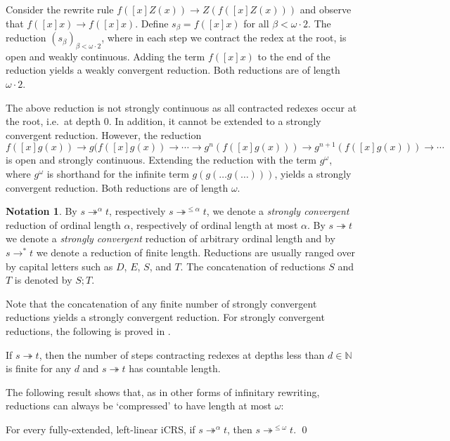 \documentclass{LMCS}
\theoremstyle{definition}
\newtheorem{notation}[thm]{Notation}
\newcommand{\rew}{\rightarrow}
\newcommand{\rewt}{\rightarrow^*}
\newcommand{\trewt}{\twoheadrightarrow}
\newcommand{\trewtp}[1]{\twoheadrightarrow^{#1}}
\newcommand{\natnum}{\mathbb{N}}
\begin{document}
\begin{exa}
\label{ex:wconv}
Consider the rewrite rule $f([x]Z(x)) \rew Z(f([x]Z(x)))$ and observe that $f([x]x) \rew f([x]x)$. Define $s_\beta = f([x]x)$ for all $\beta < \omega \cdot 2$. The reduction $(s_\beta)_{\beta < \omega \cdot 2}$, where in each step we contract the redex at the root, is open and weakly continuous. Adding the term $f([x]x)$ to the end of the reduction yields a weakly convergent reduction. Both reductions are of length $\omega \cdot 2$.

The above reduction is not strongly continuous as all contracted redexes occur at the root, i.e.\ at depth $0$. 
In addition, it cannot be extended to a strongly convergent reduction.
However, the reduction
\[
f([x]g(x)) \rew g(f([x]g(x)) \rew \cdots \rew g^n(f([x]g(x))) \rew g^{n + 1}(f([x]g(x))) \rew \cdots
\]
is open and strongly continuous. Extending the reduction with the term $g^\omega$, where $g^\omega$ is shorthand for the infinite term $g(g(\ldots g(\ldots)))$, yields a strongly convergent reduction. Both reductions are of length $\omega$.
\end{exa}

\begin{notation}
By $s \trewtp{\alpha} t$, respectively $s \trewtp{\leq \alpha} t$, we
denote a \emph{strongly convergent} reduction of ordinal
length $\alpha$, respectively of ordinal length at most
$\alpha$. By $s \trewt t$ we denote a \emph{strongly convergent}
reduction of arbitrary ordinal length and by $s \rewt t$
we denote a reduction of finite length.
Reductions are usually ranged over by
capital letters such as $D$, $E$, $S$, and $T$.
The concatenation of reductions $S$ and $T$ 
is denoted by $S ; T$.
\end{notation}

Note that the concatenation of any finite number of strongly convergent reductions yields a strongly convergent reduction. For strongly convergent reductions, the following is proved in \cite{JJ05a}.
\begin{lem}
\label{depthlem}
If $s \trewt t$, then the number of steps contracting redexes at depths less than $d \in \natnum$ is finite for any $d$ and $s \trewt t$ has countable length.
\end{lem}

The following result \cite{JJ05a} shows that, as in other forms of infinitary rewriting, reductions can always be `compressed' to have length at most $\omega$:

\begin{thm}[Compression]
\label{the:compression}
For every fully-extended, left-linear iCRS, if $s \trewtp{\alpha} t$, then $s \trewtp{\leq \omega} t$. \qed
\end{thm}
\end{document}
